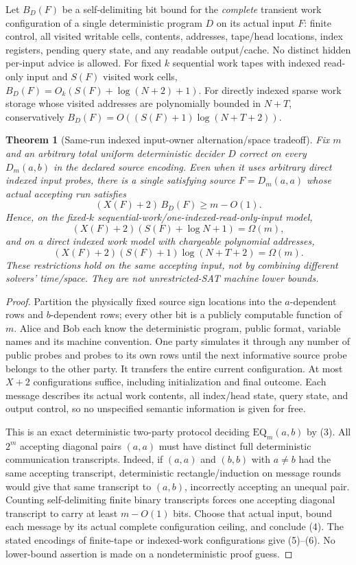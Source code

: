\documentclass[11pt]{article}
\newtheorem{theorem}{Theorem}
\begin{document}
Let $B_D(F)$ be a self-delimiting bit bound for the \emph{complete} transient work configuration of a single deterministic program $D$ on its actual input $F$: finite control, all visited writable cells, contents, addresses, tape/head locations, index registers, pending query state, and any readable output/cache. No distinct hidden per-input advice is allowed. For fixed $k$ sequential work tapes with indexed read-only input and $S(F)$ visited work cells, $B_D(F)=O_k(S(F)+\log(N+2)+1)$. For directly indexed sparse work storage whose visited addresses are polynomially bounded in $N+T$, conservatively $B_D(F)=O((S(F)+1)\log(N+T+2))$.

\begin{theorem}[Same-run indexed input-owner alternation/space tradeoff]\label{th:exchange}
Fix $m$ and an arbitrary total uniform deterministic decider $D$ correct on every $D_m(a,b)$ in the declared source encoding. Even when it uses arbitrary direct indexed \emph{input} probes, there is a single satisfying source $F=D_m(a,a)$ whose actual accepting run satisfies
\[
\boxed{(X(F)+2)\,B_D(F)\ge m-O(1).}\tag{4}
\]
Hence, on the fixed-$k$ sequential-work/one-indexed-read-only-input model,
\[
(X(F)+2)(S(F)+\log N+1)=\Omega(m),
\tag{5}
\]
and on a direct indexed work model with chargeable polynomial addresses,
\[
(X(F)+2)(S(F)+1)\log(N+T+2)=\Omega(m).
\tag{6}
\]
These restrictions hold on the \emph{same accepting input}, not by combining different solvers' time/space. They are not unrestricted-SAT machine lower bounds.
\end{theorem}
\begin{proof}
Partition the physically fixed source sign locations into the $a$-dependent rows and $b$-dependent rows; every other bit is a publicly computable function of $m$. Alice and Bob each know the deterministic program, public format, variable names and its machine convention. One party simulates it through any number of public probes and probes to its own rows until the next informative source probe belongs to the other party. It transfers the entire current configuration. At most $X+2$ configurations suffice, including initialization and final outcome. Each message describes its actual work contents, all index/head state, query state, and output control, so no unspecified semantic information is given for free.

This is an exact deterministic two-party protocol deciding $\mathrm{EQ}_m(a,b)$ by (3). All $2^m$ accepting diagonal pairs $(a,a)$ must have distinct full deterministic communication transcripts. Indeed, if $(a,a)$ and $(b,b)$ with $a\ne b$ had the same accepting transcript, deterministic rectangle/induction on message rounds would give that same transcript to $(a,b)$, incorrectly accepting an unequal pair. Counting self-delimiting finite binary transcripts forces one accepting diagonal transcript to carry at least $m-O(1)$ bits. Choose that actual input, bound each message by its actual complete configuration ceiling, and conclude (4). The stated encodings of finite-tape or indexed-work configurations give (5)--(6). No lower-bound assertion is made on a nondeterministic proof guess.
\end{proof}
\end{document}
